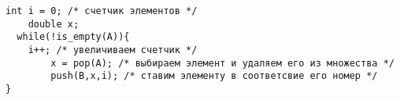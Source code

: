 \begin{lstlisting}[escapechar=\%]
  int i = 0; /* счетчик элементов */
	double x;
  while(!is_empty(A)){
    i++; /* увеличиваем счетчик */
		x = pop(A); /* выбираем элемент и удаляем его из множества */
		push(B,x,i); /* ставим элементу в соответсвие его номер */
}
\end{lstlisting}
